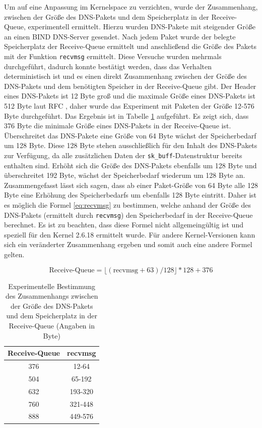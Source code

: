 \documentclass[a4paper, 12pt, BCOR10mm, DIV12, toc=bibliography, toc=listof, german]{scrbook}
\begin{document}
		Um auf eine Anpassung im Kernelspace zu verzichten, wurde der Zusammenhang, zwischen der Größe
		des DNS-Pakets und dem Speicherplatz in der Receive-Queue, experimentell ermittelt. Hierzu
		wurden DNS-Pakete mit steigender Größe an einen BIND DNS-Server gesendet. Nach jedem Paket wurde
		der belegte Speicherplatz der Receive-Queue ermittelt und anschließend die Größe des Pakets mit
		der Funktion \texttt{recvmsg} ermittelt. Diese Versuche wurden mehrmals durchgeführt, dadurch
		konnte bestätigt werden, dass das Verhalten deterministisch ist und es einen direkt Zusammenhang
		zwischen der Größe des DNS-Pakets und dem benötigten Speicher in der Receive-Queue gibt. Der
		Header eines DNS-Pakets ist 12 Byte groß und die maximale Größe eines DNS-Pakets ist 512 Byte
		laut RFC \cite{rfc1035}, daher wurde das Experiment mit Paketen der Größe 12-576 Byte
		durchgeführt. Das Ergebnis ist in Tabelle \ref{tab:recvmsg} aufgeführt. Es zeigt sich, dass 376
		Byte die minimale Größe eines DNS-Pakets in der Receive-Queue ist. Überschreitet das DNS-Pakete
		eine Größe von 64 Byte wächst der Speicherbedarf um 128 Byte. Diese 128 Byte stehen
		ausschließlich für den Inhalt des DNS-Pakets zur Verfügung, da alle zusätzlichen Daten der
		\texttt{sk\_buff}-Datenstruktur bereits enthalten sind. Erhöht sich die Größe des DNS-Pakets
		ebenfalls um 128 Byte und überschreitet 192 Byte, wächst der Speicherbedarf wiederum um 128 Byte
		an. Zusammengefasst lässt sich sagen, dass ab einer Paket-Größe von 64 Byte alle 128 Byte eine
		Erhöhung des Speicherbedarfs um ebenfalls 128 Byte eintritt. Daher ist es möglich die Formel
		\ref{eq:recvmsg} zu bestimmen, welche anhand der Größe des DNS-Pakets (ermittelt durch
		\texttt{recvmsg}) den Speicherbedarf in der Receive-Queue berechnet. Es ist zu beachten, dass
		diese Formel nicht allgemeingültig ist und speziell für den Kernel 2.6.18 ermittelt wurde. Für
		andere Kernel-Versionen kann sich ein veränderter Zusammenhang ergeben und somit auch eine
		andere Formel gelten.		

		\begin{equation}
			\text{Receive-Queue} = \lfloor (\text{recvmsg} + 63) / 128 \rfloor * 128 + 376	
			\label{eq:recvmsg}
		\end{equation}

		\begin{table}
			\centering
			\begin{tabular}{|c|c|}\hline
				Receive-Queue & recvmsg \\\hline\hline
				376 & 12-64	\\
				504 & 65-192	\\
				632 & 193-320	\\
				760 & 321-448 \\
				888 &	449-576\\\hline
			\end{tabular}
			\caption{Experimentelle Bestimmung des Zusammenhangs zwischen der Größe des DNS-Pakets und dem
			Speicherplatz in der Receive-Queue (Angaben in Byte)}
			\label{tab:recvmsg}
		\end{table}
\end{document}

